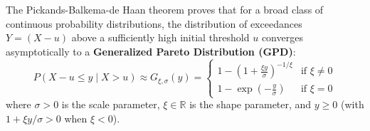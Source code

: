 The Pickands-Balkema-de Haan theorem proves that for a broad class of continuous probability distributions, the distribution of exceedances $Y = (X - u)$ above a sufficiently high initial threshold $u$ converges asymptotically to a \textbf{Generalized Pareto Distribution (GPD)}:
\begin{equation}
    P(X - u \le y \mid X > u) \approx G_{\xi, \sigma}(y) = \begin{cases}
        1 - \left(1 + \frac{\xi y}{\sigma}\right)^{-1/\xi} & \text{if } \xi \ne 0 \\
        1 - \exp\left(-\frac{y}{\sigma}\right) & \text{if } \xi = 0
    \end{cases}
\end{equation}
where $\sigma > 0$ is the scale parameter, $\xi \in \mathbb{R}$ is the shape parameter, and $y \ge 0$ (with $1 + \xi y / \sigma > 0$ when $\xi < 0$).

